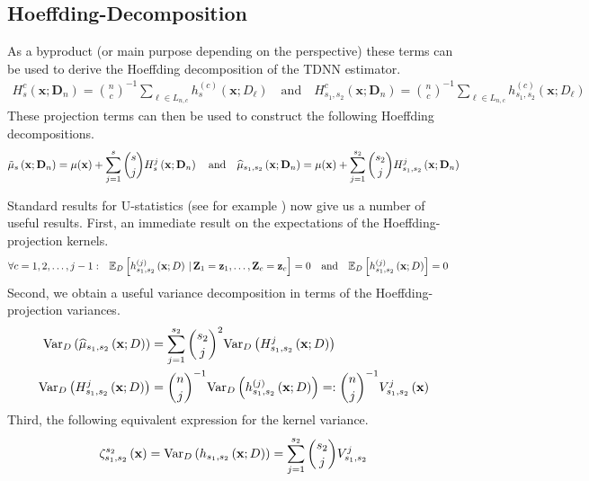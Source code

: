 \subsection{Hoeffding-Decomposition}
As a byproduct (or main purpose depending on the perspective) these terms can be used to derive the Hoeffding decomposition of the TDNN estimator.
\begin{equation}\label{eq:H_projection}
	\begin{aligned}
		H_{s}^{c}\left(\mathbf{x}; \mathbf{D}_n\right)
		= \binom{n}{c}^{-1} \sum_{\ell \in L_{n,c}} h^{(c)}_{s}(\mathbf{x}; D_{\ell})
		\quad \text{and} \quad
		H_{s_1, s_2}^{c}\left(\mathbf{x}; \mathbf{D}_n\right)
		= \binom{n}{c}^{-1} \sum_{\ell \in L_{n,c}} h^{(c)}_{s_1, s_2}(\mathbf{x}; D_{\ell})
	\end{aligned}
\end{equation}
These projection terms can then be used to construct the following Hoeffding decompositions.
\begin{equation}\label{eq:H_Decomp}
	\tilde{\mu}_{s}\left(\mathbf{x}; \mathbf{D}_n\right)
	= \mu(\mathbf{x}) + \sum_{j = 1}^{s}\binom{s}{j}H_{s}^{j}\left(\mathbf{x}; \mathbf{D}_n\right)\\
	\quad \text{and} \quad
	\hat{\mu}_{s_1, s_2}\left(\mathbf{x}; \mathbf{D}_n\right)
	= \mu(\mathbf{x}) + \sum_{j = 1}^{s_2}\binom{s_2}{j}H_{s_1, s_2}^{j}\left(\mathbf{x}; \mathbf{D}_n\right)
\end{equation}

Standard results for U-statistics (see for example \citet{lee_u-statistics_2019}) now give us a number of useful results.
First, an immediate result on the expectations of the Hoeffding-projection kernels.
\begin{align}\label{eq:H_k_expectation}
	\forall c = 1,2,\dotsc, j-1: \quad & \E_{D}\left[h_{s_1, s_2}^{(j)}\left(\mathbf{x}; D\right) \, | \, \mathbf{Z}_1 = \mathbf{z}_1, \dotsc, \mathbf{Z}_c = \mathbf{z}_c\right] = 0
	\quad \text{and} \quad
	\E_{D}\left[h_{s_1, s_2}^{(j)}\left(\mathbf{x}; D\right)\right] = 0
\end{align}
Second, we obtain a useful variance decomposition in terms of the Hoeffding-projection variances.
\begin{align}\label{eq:Var_decomp}
	\Var_{D}\left(\hat{\mu}_{s_1, s_2}\left(\mathbf{x}; D\right)\right)
	 & = \sum_{j = 1}^{s_2} \binom{s_2}{j}^2 \Var_{D}\left(H_{s_1, s_2}^{j}\left(\mathbf{x}; D\right)\right) \\
	\Var_{D}\left(H_{s_1, s_2}^{j}\left(\mathbf{x}; D\right)\right)
	 & = \binom{n}{j}^{-1} \Var_{D}\left(h_{s_1, s_2}^{(j)}\left(\mathbf{x}; D\right)\right)
	=: \binom{n}{j}^{-1} V_{s_1, s_2}^{j}\left(\mathbf{x}\right)
\end{align}
Third, the following equivalent expression for the kernel variance.
\begin{equation}\label{eq:k_var}
	\zeta_{s_1, s_2}^{s_2}\left(\mathbf{x}\right)
	= \Var_{D}\left(h_{s_1, s_2}\left(\mathbf{x}; D\right)\right)
	= \sum_{j = 1}^{s_2} \binom{s_2}{j}V_{s_1, s_2}^{j}
\end{equation}